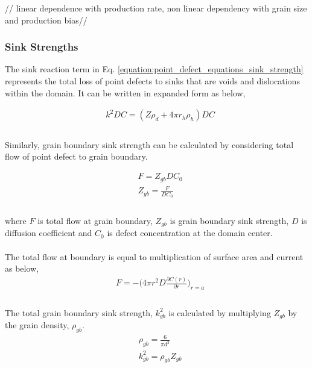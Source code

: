 \documentclass[a4paper]{article}
\begin{document}
//
linear dependence with production rate, non linear dependency with grain size and production bias//


    \newpage
    \subsubsection{Sink Strengths} \hspace{10pt}
    The sink reaction term in Eq. \ref{equation:point_defect_equations_sink_strength} represents the total loss of point defects to sinks that are voids and dislocations within the domain. It can be written in expanded form as below,

    \begin{equation}
      \begin{aligned}
        &k^2DC=(Z\rho_d+4\pi r_h\rho_h)DC\\
      \end{aligned}
    \end{equation}\\
    Similarly, grain boundary sink strength can be calculated by considering total flow of point defect to grain boundary.

    \begin{equation}
      \begin{aligned}
        &F=Z_{gb}DC_0\\
        &Z_{gb}=\frac{F}{DC_0}\\
      \end{aligned}
      \end{equation}\\

    where ${F}$ is total flow at grain boundary, ${Z_{gb}}$ is grain boundary sink strength, ${D}$ is diffusion coefficient and ${C_0}$ is defect concentration at the domain center.\\\\
    The total flow at boundary is equal to multiplication of surface area and current as below,\\

    \begin{equation}
      \begin{aligned}
        &F=-\bigg(4\pi r^2D\frac{\partial C(r)}{\partial r}\bigg)_{r=a}\\
      \end{aligned}
    \end{equation}\\
    The total grain boundary sink strength, ${k^2_{gb}}$ is calculated by multiplying ${Z_{gb}}$ by the grain density, ${\rho_{gb}}$.\cite{heald1977}
    \begin{equation}
      \begin{aligned}
        &\rho_{gb}=\frac{6}{\pi d^3}\\
        &k^2_{gb}=\rho_{gb}Z_{gb}\\
      \end{aligned}
    \end{equation}
\end{document}
